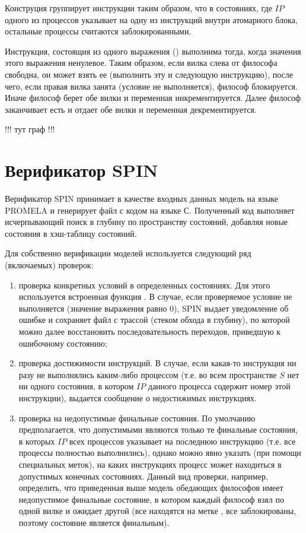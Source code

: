 Конструция  группирует инструкции таким образом, что в состояниях, где $IP$
одного из процессов указывает на одну из инструкций внутри атомарного блока, остальные
процессы считаются заблокированными.

Инструкция, состоящия из одного выражения () выполнима тогда, когда
значения этого выражения ненулевое. Таким образом, если вилка слева от философа свободна,
он может взять ее (выполнить эту и следующую инструкцию), после чего, если правая вилка
занята (условие  не выполняется), философ
блокируется. Иначе философ берет обе вилки и переменная 
инкрементируется. Далее философ заканчивает есть и отдает обе вилки и переменная
 декрементируется.

!!! тут граф !!!

\section{Верификатор SPIN}
\label{sec:spin}

Верификатор SPIN принимает в качестве входных данных модель на языке PROMELA и генерирует
файл с кодом на языке С. Полученный код выполняет исчерпывающий поиск в глубину по
пространству состояний, добавляя новые состояния в хэш-таблицу состояний.

Для собственно верификации моделей используется следующий ряд (включаемых) проверок:

\begin{enumerate}
\item проверка конкретных условий в определенных состояниях. Для этого используется
  встроенная функция . В случае, если проверяемое условие не выполняется
  (значение выражения равно 0), SPIN выдает уведомление об ошибке и сохраняет файл с
  трассой (стеком обхода в глубину), по которой можно далее восстановить
  последовательность переходов, приведшую к ошибочному состоянию;

\item проверка достижимости инструкций. В случае, если какая-то инструкция ни разу не
  выполнялись каким-либо процессом (т.е. во всем пространстве $S$ нет ни одного состояния,
  в котором $IP$ данного процесса содержит номер этой инструкции), выдается сообщение о
  недостижимых инструкциях.

\item проверка на недопустимые финальные состояния. По умолчанию предполагается, что
  допустимыми являются только те финальные состояния, в которых $IP$ всех процессов
  указывает на последнюю инструкцию (т.е. все процессы полностью выполнились), однако
  можно явно указать (при помощи специальных меток), на каких инструкциях процесс может
  находиться в допустимых конечных состояниях. Данный вид проверки, например, определить,
  что приведенная выше модель обедающих философов имеет недопустимое финальные состояние,
  в котором каждый философ взял по одной вилке и ожидает другой (все находятся на метке
  , все заблокированы, поэтому состояние является финальным).
\end{enumerate}

